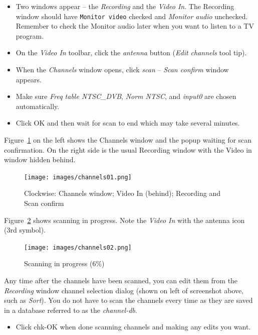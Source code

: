 \begin{itemize}
    \item Two windows appear --  the \textit{Recording} and the \textit{Video In}.  The Recording window should have \texttt{Monitor video} checked and \textit{Monitor audio} unchecked.  Remember to check the Monitor audio later when you want to listen to a TV program.
    \item On the \textit{Video In} toolbar, click the \textit{antenna} button (\textit{Edit channels} tool tip).
    \item When the \textit{Channels} window opens, click \textit{scan} -- \textit{Scan confirm} window appears.
    \item Make sure \textit{Freq table NTSC\_DVB}, \textit{Norm NTSC}, and \textit{input0} are chosen automatically.
    \item Click OK and then wait for scan to end which may take several minutes.
\end{itemize}

Figure~\ref{fig:channels01} on the left shows the Channels window and the popup waiting for scan confirmation.  On the right side is the usual Recording window with the Video in window hidden behind.

\begin{figure}[htpb]
    \centering
    \texttt{[image: images/channels01.png]}
    \caption{Clockwise: Channels window; Video In (behind); Recording and Scan confirm}
    \label{fig:channels01}
\end{figure}

Figure~\ref{fig:channels02} shows scanning in progress.  Note the \textit{Video In} with the antenna icon (3rd symbol).

\begin{figure}[htpb]
    \centering
    \texttt{[image: images/channels02.png]}
    \caption{Scanning in progress ($6\%$)}
    \label{fig:channels02}
\end{figure}

Any time after the channels have been scanned, you can edit them from the \textit{Recording} window channel selection dialog (shown on left of screenshot above, such as \textit{Sort}).  You do not have to scan the channels every time as they are saved in a database referred to as the \textit{channel-db}.

\begin{itemize}
    \item Click chk-OK when done scanning channels and making any edits you want.
\end{itemize}

